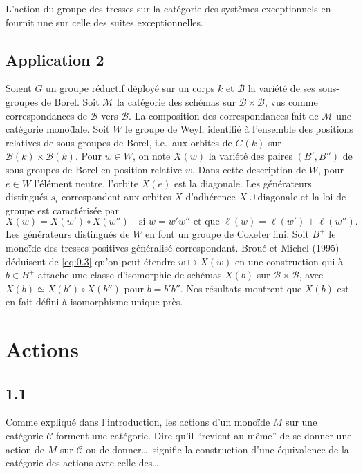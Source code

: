 \documentclass[11pt,a4paper]{article}
\theoremstyle{plain}
\theoremstyle{definition}
\newcommand{\cC}{\mathscr{C}}
\newcommand{\cM}{\mathscr{M}}
\begin{document}
L'action du groupe des tresses sur la cat\'egorie des syst\`emes exceptionnels en fournit une sur celle des suites exceptionnelles.

\subsection*{Application 2}

Soient $G$ un groupe r\'eductif d\'eploy\'e sur un corps $k$ et $\mathcal{B}$ la vari\'et\'e de ses sous-groupes de Borel. Soit $\cM$ la cat\'egorie des sch\'emas sur $\mathcal{B} \times \mathcal{B}$, vus comme correspondances de $\mathcal{B}$ vers $\mathcal{B}$. La composition des correspondances fait de $\cM$ une cat\'egorie mono\"dale. Soit $W$ le groupe de Weyl, identifi\'e \`a l'ensemble des positions relatives de sous-groupes de Borel, i.e.\ aux orbites de $G(k)$ sur $\mathcal{B}(k) \times \mathcal{B}(k)$. Pour $w \in W$, on note $X(w)$ la vari\'et\'e des paires $(B', B'')$ de sous-groupes de Borel en position relative $w$. Dans cette description de $W$, pour $e \in W$ l'\'el\'ement neutre, l'orbite $X(e)$ est la diagonale. Les g\'en\'erateurs distingu\'es $s_i$ correspondent aux orbites $X$ d'adh\'erence $X \cup \text{diagonale}$ et la loi de groupe est caract\'eris\'ee par
\begin{equation}\label{eq:0.3}
X(w) = X(w') \circ X(w'') \quad \text{si } w = w'w'' \text{ et que } \ell(w) = \ell(w') + \ell(w'').
\tag{0.3}
\end{equation}
Les g\'en\'erateurs distingu\'es de $W$ en font un groupe de Coxeter fini. Soit $B^+$ le mono\"ide des tresses positives g\'en\'eralis\'e correspondant. Brou\'e et Michel (1995) d\'eduisent de \eqref{eq:0.3} qu'on peut \'etendre $w \mapsto X(w)$ en une construction qui \`a $b \in B^+$ attache une classe d'isomorphie de sch\'emas $X(b)$ sur $\mathcal{B} \times \mathcal{B}$, avec $X(b) \simeq X(b') \circ X(b'')$ pour $b = b'b''$. Nos r\'esultats montrent que $X(b)$ est en fait d\'efini \`a isomorphisme unique pr\`es.

\section{Actions}\label{sec:actions}

\subsection*{1.1}

Comme expliqu\'e dans l'introduction, les actions d'un mono\"ide $M$ sur une cat\'egorie $\cC$ forment une cat\'egorie. Dire qu'il ``revient au m\^eme'' de se donner une action de $M$ sur $\cC$ ou de donner\ldots\ signifie la construction d'une \'equivalence de la cat\'egorie des actions avec celle des\ldots.
\end{document}
